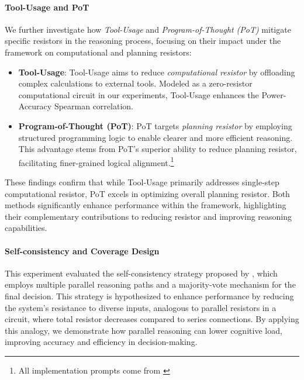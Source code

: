 \paragraph{Tool-Usage and PoT}  
We further investigate how \textit{Tool-Usage} and \textit{Program-of-Thought (PoT)} mitigate specific resistors in the reasoning process, focusing on their impact under the \modelname{} framework on computational and planning resistors:
\begin{itemize}[leftmargin=4ex]
    \item \textbf{Tool-Usage}: Tool-Usage aims to reduce \textit{computational resistor} by offloading complex calculations to external tools. Modeled as a zero-resistor computational circuit in our experiments, Tool-Usage enhances the Power-Accuracy Spearman correlation.
    \item \textbf{Program-of-Thought (PoT)}: PoT targets \textit{planning resistor} by employing structured programming logic to enable clearer and more efficient reasoning. This advantage stems from PoT's superior ability to reduce planning resistor, facilitating finer-grained logical alignment.\footnote{All implementation prompts come from \citet{chen2024unlocking}}
\end{itemize} 
These findings confirm that while Tool-Usage primarily addresses single-step computational resistor, PoT excels in optimizing overall planning resistor. Both methods significantly enhance performance within the \modelname{} framework, highlighting their complementary contributions to reducing resistor and improving reasoning capabilities.

\paragraph{Self-consistency and Coverage Design} 
This experiment evaluated the self-consistency strategy proposed by \citet{wang2023selfconsistency}, which employs multiple parallel reasoning paths and a majority-vote mechanism for the final decision. This strategy is hypothesized to enhance performance by reducing the system's resistance to diverse inputs, analogous to parallel resistors in a circuit, where total resistor decreases compared to series connections. By applying this analogy, we demonstrate how parallel reasoning can lower cognitive load, improving accuracy and efficiency in decision-making.

